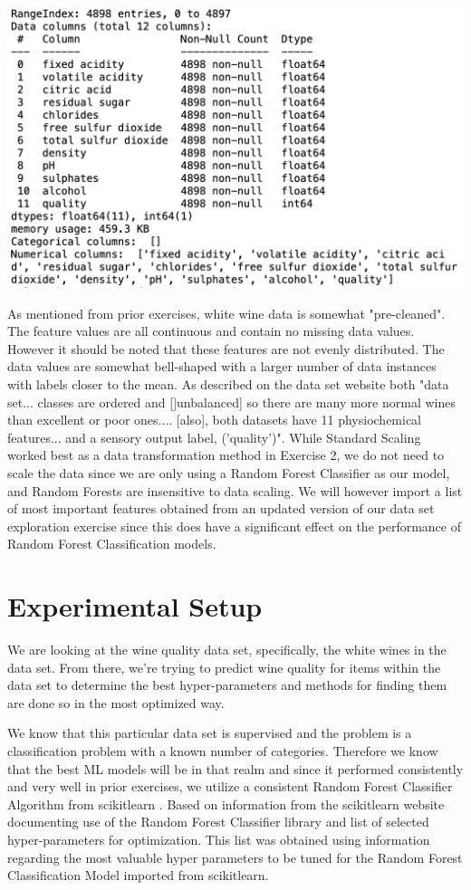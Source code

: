 \documentclass[titlepage]{article}
\begin{document}
	\begin{center}
	\includegraphics[width=.75\textwidth]{img/white.png}
	\end{center}

	
	\noindent As mentioned from prior exercises, white wine data is somewhat "pre-cleaned".   The feature values are all continuous and contain no missing data values.  However it should be noted that these features are not evenly distributed.  The data values are somewhat bell-shaped with a larger number of data instances with labels closer to the mean.  As described on the data set website \cite{dataset} both "data set... classes are ordered and []unbalanced] so there are many more normal wines than excellent or poor ones.... [also], both datasets have 11 physiochemical features... and a sensory output label, ('quality')".  While Standard Scaling worked best as a data transformation method in Exercise 2, we do not need to scale the data since we are only using a Random Forest Classifier as our model, and Random Forests are insensitive to data scaling.  We will however import a list of most important features obtained from an updated version of our data set exploration exercise since this does have a significant effect on the performance of Random Forest Classification models.  
	

	\section*{Experimental Setup}
		We are looking at the wine quality data set, specifically, the white wines in the data set.  From there, we're trying to predict wine quality for items within the data set to determine the best hyper-parameters and methods for finding them are done so in the most optimized way.  
		
		\vspace{.2cm}
		We know that this particular data set is supervised and the problem is a classification problem with a known number of categories. Therefore we know that the best ML models will be in that realm and since it performed consistently and very well in prior exercises, we utilize a consistent Random Forest Classifier Algorithm from scikitlearn  \cite{scikitlearn}.  Based on information from the scikitlearn website documenting use of the Random Forest Classifier library and list of selected hyper-parameters for optimization.  This list was obtained using information regarding the most valuable hyper parameters to be tuned for the Random Forest Classification Model imported from scikitlearn. 
		
\end{document}
